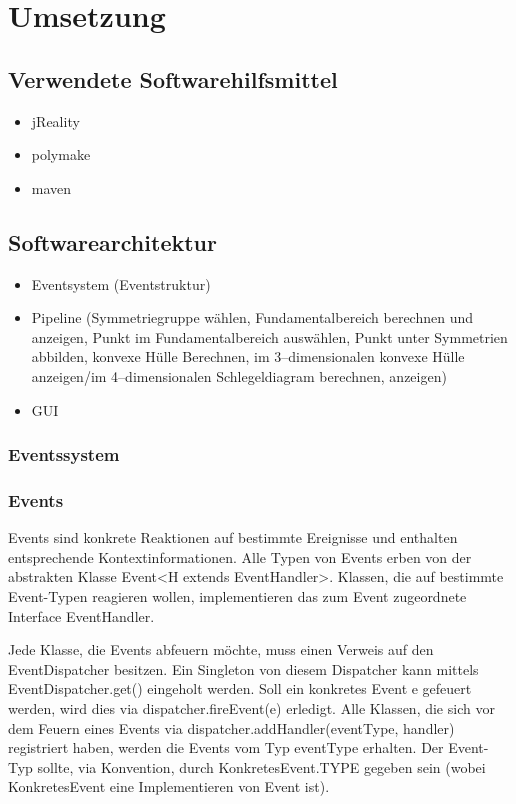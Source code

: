 \section{Umsetzung}

\subsection{Verwendete Softwarehilfsmittel}
    \begin{itemize}
        \item jReality
        \item polymake
        \item maven
    \end{itemize}
    
\subsection{Softwarearchitektur}
    \begin{itemize}
        \item Eventsystem (Eventstruktur)
        \item Pipeline (Symmetriegruppe wählen, Fundamentalbereich berechnen und anzeigen, Punkt im Fundamentalbereich auswählen, Punkt unter Symmetrien abbilden, konvexe Hülle Berechnen, im 3--dimensionalen konvexe Hülle anzeigen/im 4--dimensionalen Schlegeldiagram berechnen, anzeigen)
        \item GUI
    \end{itemize}
    \subsubsection{Eventssystem}
        \subsubsection*{Events}
            Events sind konkrete Reaktionen auf bestimmte Ereignisse und enthalten entsprechende Kontextinformationen. Alle Typen von Events erben von der abstrakten Klasse Event<H extends EventHandler>. Klassen, die auf bestimmte Event-Typen reagieren wollen, implementieren das zum Event zugeordnete Interface EventHandler.

            Jede Klasse, die Events abfeuern möchte, muss einen Verweis auf den EventDispatcher besitzen. Ein Singleton von diesem Dispatcher kann mittels EventDispatcher.get() eingeholt werden. Soll ein konkretes Event e gefeuert werden, wird dies via dispatcher.fireEvent(e) erledigt. Alle Klassen, die sich vor dem Feuern eines Events via dispatcher.addHandler(eventType, handler) registriert haben, werden die Events vom Typ eventType erhalten. Der Event-Typ sollte, via Konvention, durch KonkretesEvent.TYPE gegeben sein (wobei KonkretesEvent eine Implementieren von Event ist).
